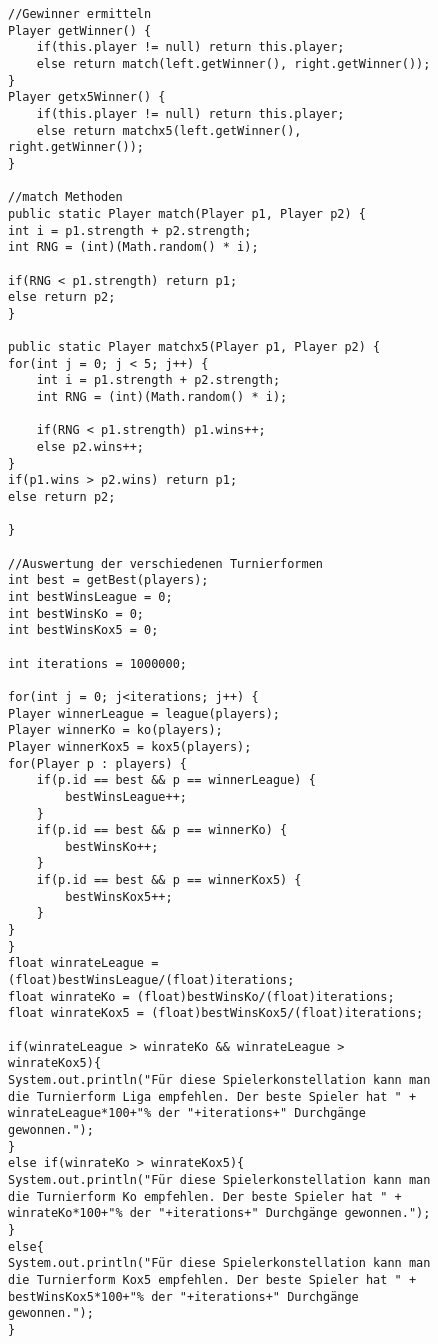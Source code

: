 \documentclass[a4paper, 12pt]{scrartcl}
\begin{document}
\begin{figure}[H]
    \centering
    \begin{lstlisting}
//Gewinner ermitteln
Player getWinner() {
    if(this.player != null) return this.player;
    else return match(left.getWinner(), right.getWinner());
}
Player getx5Winner() {
    if(this.player != null) return this.player;
    else return matchx5(left.getWinner(), right.getWinner());
}

//match Methoden
public static Player match(Player p1, Player p2) {
int i = p1.strength + p2.strength;
int RNG = (int)(Math.random() * i);

if(RNG < p1.strength) return p1;
else return p2;
}

public static Player matchx5(Player p1, Player p2) {
for(int j = 0; j < 5; j++) {
    int i = p1.strength + p2.strength;
    int RNG = (int)(Math.random() * i);
    
    if(RNG < p1.strength) p1.wins++;
    else p2.wins++;
}
if(p1.wins > p2.wins) return p1;
else return p2;

}

//Auswertung der verschiedenen Turnierformen
int best = getBest(players);
int bestWinsLeague = 0;
int bestWinsKo = 0;
int bestWinsKox5 = 0;

int iterations = 1000000;

for(int j = 0; j<iterations; j++) {
Player winnerLeague = league(players);
Player winnerKo = ko(players);
Player winnerKox5 = kox5(players);
for(Player p : players) {
    if(p.id == best && p == winnerLeague) {
        bestWinsLeague++;
    }
    if(p.id == best && p == winnerKo) {
        bestWinsKo++;
    }
    if(p.id == best && p == winnerKox5) {
        bestWinsKox5++;
    }
}
}
float winrateLeague = (float)bestWinsLeague/(float)iterations;
float winrateKo = (float)bestWinsKo/(float)iterations;
float winrateKox5 = (float)bestWinsKox5/(float)iterations;

if(winrateLeague > winrateKo && winrateLeague > winrateKox5){
System.out.println("Für diese Spielerkonstellation kann man die Turnierform Liga empfehlen. Der beste Spieler hat " + winrateLeague*100+"% der "+iterations+" Durchgänge gewonnen.");
}
else if(winrateKo > winrateKox5){
System.out.println("Für diese Spielerkonstellation kann man die Turnierform Ko empfehlen. Der beste Spieler hat " + winrateKo*100+"% der "+iterations+" Durchgänge gewonnen.");
}
else{
System.out.println("Für diese Spielerkonstellation kann man die Turnierform Kox5 empfehlen. Der beste Spieler hat " + bestWinsKox5*100+"% der "+iterations+" Durchgänge gewonnen.");
}

\end{lstlisting}
\end{figure}
\end{document}
